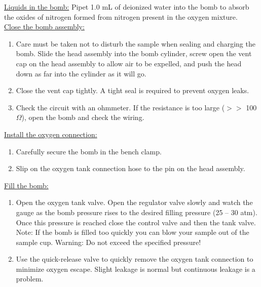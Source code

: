 \documentclass[byrevtex,amssymb,aps,pra,floatfix,letterpaper]{revtex4}
\begin{document}
\noindent
\underline{Liquids in the bomb:} Pipet 1.0 mL of deionized water into the bomb to absorb the oxides of nitrogen formed from nitrogen present in the oxygen mixture.\\

\noindent
\underline{Close the bomb assembly:}\\

\noindent
\begin{enumerate}

\item Care must be taken not to disturb the sample when sealing and charging the bomb. Slide the head assembly into the bomb cylinder, screw open the vent cap on the head assembly to allow air to be expelled, and push the head down as far into the cylinder as it will go.

\item Close the vent cap tightly. A tight seal is required to prevent oxygen leaks.

\item Check the circuit with an ohmmeter. If the resistance is too large ($>>$ 100 $\Omega$), open the bomb and check the wiring.

\end{enumerate}

\underline{Install the oxygen connection:}\\

\begin{enumerate}

\item Carefully secure the bomb in the bench clamp.

\item Slip on the oxygen tank connection hose to the pin on the head assembly.

\end{enumerate}

\underline{Fill the bomb:}\\

\begin{enumerate}
\item Open the oxygen tank valve. Open the regulator valve slowly and watch the gauge as the bomb pressure rises to the desired filling pressure (25 -- 30 atm). Once this pressure is reached close the control valve and then the tank valve. Note: If the bomb is filled too quickly you can blow your sample out of the sample cup. Warning: Do not exceed the specified pressure!

\item Use the quick-release valve to quickly remove the oxygen tank connection to minimize oxygen escape. Slight leakage is normal but continuous leakage is a problem.

\end{enumerate}
\end{document}
